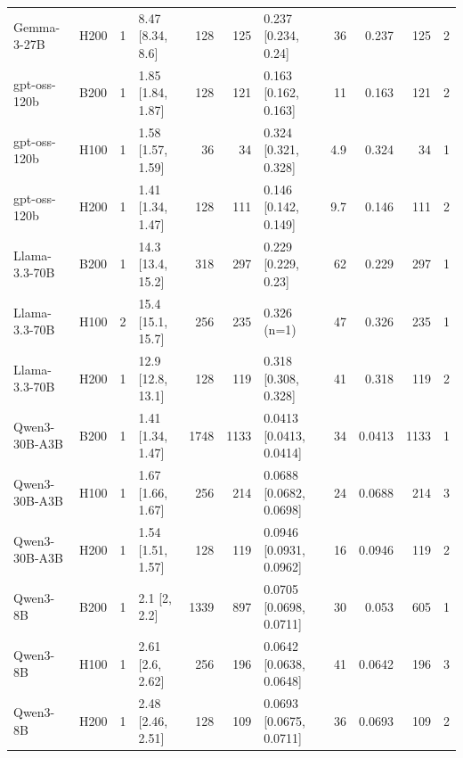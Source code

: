 \begin{landscape}
\begin{table}[t]
\begin{tabular}{llrlrrlrrrr}
Gemma-3-27B & H200 & 1 & 8.47 {[}8.34, 8.6{]} & 128 & 125 & 0.237 {[}0.234, 0.24{]} & 36 & 0.237 & 125 & 2 \\
gpt-oss-120b & B200 & 1 & 1.85 {[}1.84, 1.87{]} & 128 & 121 & 0.163 {[}0.162, 0.163{]} & 11 & 0.163 & 121 & 2 \\
gpt-oss-120b & H100 & 1 & 1.58 {[}1.57, 1.59{]} & 36 & 34 & 0.324 {[}0.321, 0.328{]} & 4.9 & 0.324 & 34 & 1 \\
gpt-oss-120b & H200 & 1 & 1.41 {[}1.34, 1.47{]} & 128 & 111 & 0.146 {[}0.142, 0.149{]} & 9.7 & 0.146 & 111 & 2 \\
Llama-3.3-70B & B200 & 1 & 14.3 {[}13.4, 15.2{]} & 318 & 297 & 0.229 {[}0.229, 0.23{]} & 62 & 0.229 & 297 & 1 \\
Llama-3.3-70B & H100 & 2 & 15.4 {[}15.1, 15.7{]} & 256 & 235 & 0.326 (n=1) & 47 & 0.326 & 235 & 1 \\
Llama-3.3-70B & H200 & 1 & 12.9 {[}12.8, 13.1{]} & 128 & 119 & 0.318 {[}0.308, 0.328{]} & 41 & 0.318 & 119 & 2 \\
Qwen3-30B-A3B & B200 & 1 & 1.41 {[}1.34, 1.47{]} & 1748 & 1133 & 0.0413 {[}0.0413, 0.0414{]} & 34 & 0.0413 & 1133 & 1 \\
Qwen3-30B-A3B & H100 & 1 & 1.67 {[}1.66, 1.67{]} & 256 & 214 & 0.0688 {[}0.0682, 0.0698{]} & 24 & 0.0688 & 214 & 3 \\
Qwen3-30B-A3B & H200 & 1 & 1.54 {[}1.51, 1.57{]} & 128 & 119 & 0.0946 {[}0.0931, 0.0962{]} & 16 & 0.0946 & 119 & 2 \\
Qwen3-8B & B200 & 1 & 2.1 {[}2, 2.2{]} & 1339 & 897 & 0.0705 {[}0.0698, 0.0711{]} & 30 & 0.053 & 605 & 1 \\
Qwen3-8B & H100 & 1 & 2.61 {[}2.6, 2.62{]} & 256 & 196 & 0.0642 {[}0.0638, 0.0648{]} & 41 & 0.0642 & 196 & 3 \\
Qwen3-8B & H200 & 1 & 2.48 {[}2.46, 2.51{]} & 128 & 109 & 0.0693 {[}0.0675, 0.0711{]} & 36 & 0.0693 & 109 & 2 \\
\bottomrule
\end{tabular}
\end{table}
\end{landscape}
\restoregeometry

